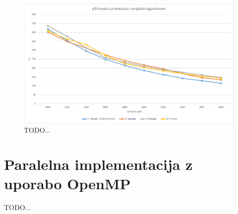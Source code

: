 \documentclass[a4paper, 12pt]{book}
\begin{document}
\begin{figure}[t]
\includegraphics[width=\textwidth]{graf_pthreads}
\caption{TODO...}
\label{img:graf_pthreads}
\centering
\end{figure}

\chapter{Paralelna implementacija z uporabo OpenMP}
\label{ch3}
TODO...
\end{document}

